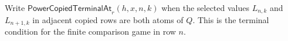 \begin{definition}
Write $\mathsf{PowerCopiedTerminalAt}_r(h,x,n,k)$ when the selected values
$L_{n,k}$ and $L_{n+1,k}$ in adjacent copied rows are both atoms of $Q$.
This is the terminal condition for the finite comparison game in row $n$.
\end{definition}
